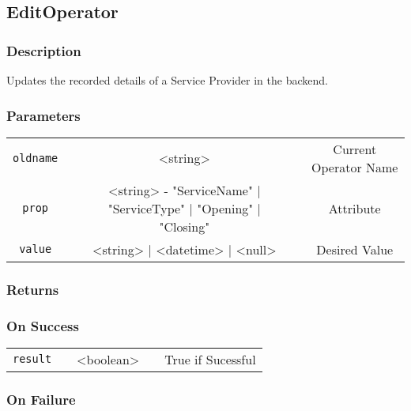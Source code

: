 \documentclass[a4paper,12pt]{article}
\begin{document}
\subsection{EditOperator}

\subsubsection{Description}

Updates the recorded details of a Service Provider in the backend.

\subsubsection{Parameters}

\begin{tabular}{ccccc}
\verb!oldname! & \vspace{15mm} & <string> & \vspace{15mm} & Current Operator Name \\
\verb!prop! & \vspace{15mm} & <string> - "ServiceName" | "ServiceType" |
"Opening" | "Closing"& \vspace{15mm} & Attribute  \\
\verb!value! & \vspace{15mm} & <string> | <datetime> | <null> & \vspace{15mm} & Desired Value \\
\end{tabular}

\subsubsection{Returns}

\subsubsection{On Success}

\begin{tabular}{ccccc}
\verb!result! & \vspace{15mm} & <boolean> & \vspace{15mm} & True if Sucessful \\
\end{tabular}

\subsubsection{On Failure}
\end{document}
